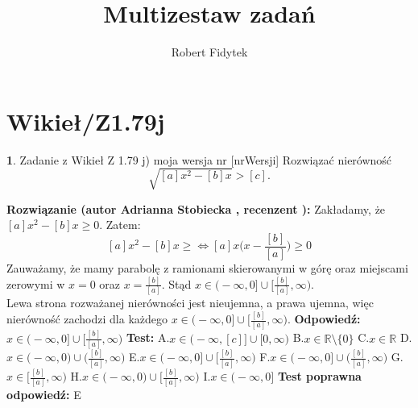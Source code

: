 \documentclass[12pt, a4paper]{article}
\title{Multizestaw zadań}
\author{Robert Fidytek}
\date{}
\theoremstyle{definition} %
\newtheorem{zad}{}
\newcommand{\kategoria}[1]{\section{#1}} %
\newcommand{\zadStart}[1]{\begin{zad}#1\newline} %
\newcommand{\zadStop}{\end{zad}}   %
\newcommand{\rozwStart}[2]{\noindent \textbf{Rozwiązanie (autor #1 , recenzent #2): }\newline} %
\newcommand{\rozwStop}{\newline}                                            %
\newcommand{\odpStart}{\noindent \textbf{Odpowiedź:}\newline}    %
\newcommand{\odpStop}{\newline}                                             %
\newcommand{\testStart}{\noindent \textbf{Test:}\newline} %
\newcommand{\testStop}{\newline} %
\newcommand{\kluczStart}{\noindent \textbf{Test poprawna odpowiedź:}\newline} %
\newcommand{\kluczStop}{\newline} %
\begin{document}
\maketitle


\kategoria{Wikieł/Z1.79j}
\zadStart{Zadanie z Wikieł Z 1.79 j) moja wersja nr [nrWersji]}
Rozwiązać nierówność
$$\sqrt{[a]x^2-[b]x}>[c].$$
\zadStop
\rozwStart{Adrianna Stobiecka}{}
Zakładamy, że $[a]x^2-[b]x\geq0$. Zatem:
$$[a]x^2-[b]x\geq\Leftrightarrow[a]x\bigg(x-\frac{[b]}{[a]}\bigg)\geq0$$
Zauważamy, że mamy parabolę z ramionami skierowanymi w górę oraz miejscami zerowymi w $x=0$ oraz $x=\frac{[b]}{[a]}$. Stąd $x\in\big(-\infty,0\big]\cup\big[\frac{[b]}{[a]},\infty\big)$.
\\Lewa strona rozważanej nierówności jest nieujemna, a prawa ujemna, więc nierówność zachodzi dla każdego $x\in\big(-\infty,0\big]\cup\big[\frac{[b]}{[a]},\infty\big)$.
\rozwStop
\odpStart
$x\in\big(-\infty,0\big]\cup\big[\frac{[b]}{[a]},\infty\big)$
\odpStop
\testStart
A.$x\in\big(-\infty,[c]\big]\cup\big[0,\infty\big)$
B.$x\in\mathbb{R}\setminus\{0\}$
C.$x\in\mathbb{R}$
D.$x\in\big(-\infty,0\big)\cup\big(\frac{[b]}{[a]},\infty\big)$
E.$x\in\big(-\infty,0\big]\cup\big[\frac{[b]}{[a]},\infty\big)$
F.$x\in\big(-\infty,0\big]\cup\big(\frac{[b]}{[a]},\infty\big)$
G.$x\in\big[\frac{[b]}{[a]},\infty\big)$
H.$x\in\big(-\infty,0\big)\cup\big[\frac{[b]}{[a]},\infty\big)$
I.$x\in\big(-\infty,0\big]$
\testStop
\kluczStart
E
\kluczStop
\end{document}
